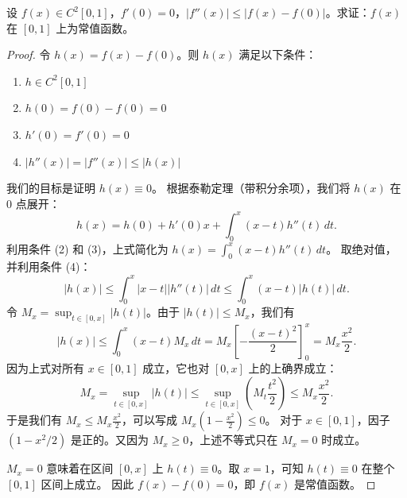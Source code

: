 \documentclass[lang=cn,10pt,thmcnt=section]{elegantbook}
\begin{document}
\begin{example}
    设 \( f(x) \in C^2[0,1] \)，\( f'(0) = 0 \)，\( |f''(x)| \leq |f(x) - f(0)| \)。求证：\( f(x) \) 在 \([0,1]\) 上为常值函数。
\end{example}
\begin{proof}
    令 $h(x) = f(x) - f(0)$。则 $h(x)$ 满足以下条件：
    \begin{enumerate}
        \item $h \in C^2[0,1]$
        \item $h(0) = f(0) - f(0) = 0$
        \item $h'(0) = f'(0) = 0$
        \item $|h''(x)| = |f''(x)| \le |h(x)|$
    \end{enumerate}
    我们的目标是证明 $h(x) \equiv 0$。
    根据泰勒定理（带积分余项），我们将 $h(x)$ 在 $0$ 点展开：
    \[ h(x) = h(0) + h'(0)x + \int_0^x (x-t)h''(t) \, dt. \]
    利用条件 (2) 和 (3)，上式简化为 $h(x) = \int_0^x (x-t)h''(t) \, dt$。
    取绝对值，并利用条件 (4)：
    \[ |h(x)| \le \int_0^x |x-t| |h''(t)| \, dt \le \int_0^x (x-t)|h(t)| \, dt. \]
    令 $M_x = \sup_{t \in [0,x]} |h(t)|$。由于 $|h(t)| \le M_x$，我们有
    \[ |h(x)| \le \int_0^x (x-t)M_x \, dt = M_x \left[ -\frac{(x-t)^2}{2} \right]_0^x = M_x \frac{x^2}{2}. \]
    因为上式对所有 $x \in [0,1]$ 成立，它也对 $[0,x]$ 上的上确界成立：
    \[ M_x = \sup_{t \in [0,x]} |h(t)| \le \sup_{t \in [0,x]} \left( M_t \frac{t^2}{2} \right) \le M_x \frac{x^2}{2}. \]
    于是我们有 $M_x \le M_x \frac{x^2}{2}$，可以写成 $M_x \left(1 - \frac{x^2}{2}\right) \le 0$。
    对于 $x \in [0, 1]$，因子 $(1-x^2/2)$ 是正的。又因为 $M_x \ge 0$，上述不等式只在 $M_x=0$ 时成立。
    
    $M_x = 0$ 意味着在区间 $[0,x]$ 上 $h(t) \equiv 0$。取 $x=1$，可知 $h(t) \equiv 0$ 在整个 $[0,1]$ 区间上成立。
    因此 $f(x)-f(0) = 0$，即 $f(x)$ 是常值函数。
\end{proof}
\end{document}
